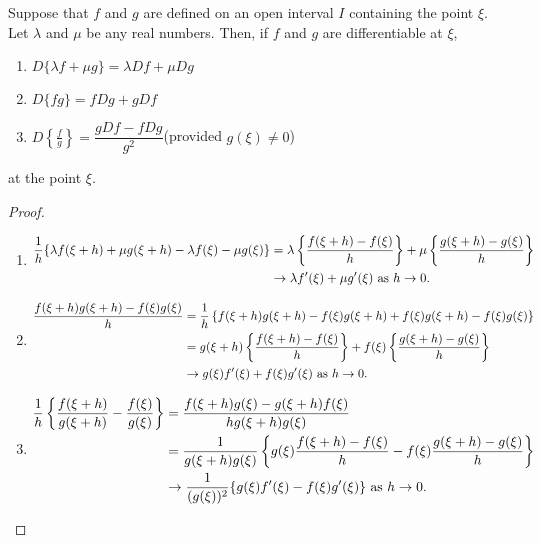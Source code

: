 \documentclass[10pt, a4paper]{article}
\begin{document}
\begin{theorem}
    Suppose that $f$ and $g$ are defined on an open interval $I$ containing the point $\xi$. Let $\lambda$ and $\mu$ be any real numbers. Then, if $f$ and $g$ are differentiable at $\xi$,
    \begin{enumerate}[label = (\roman*)]
        \item $D\{\lambda f + \mu g\} = \lambda Df + \mu Dg$
        \item $D\{fg\} = fDg + gDf$
        \item $D\left\{\frac{f}{g}\right\} = \dfrac{gDf - fDg}{g ^ 2}$\quad(provided $g(\xi) \neq 0$)
    \end{enumerate}
    at the point $\xi$.
    \begin{proof}
        \phantom{} \\
        \begin{enumerate}[label = (\roman*)]
            \item
                \begin{align*}
                    \frac{1}{h}\{\lambda f(\xi + h) + \mu g(\xi + h) - \lambda f(\xi) - \mu g(\xi)\} &= \lambda \left\{\dfrac{f(\xi + h) - f(\xi)}{h}\right\} + \mu \left\{\dfrac{g(\xi + h) - g(\xi)}{h}\right\} \\
                    &\rightarrow \lambda f'(\xi) + \mu g'(\xi) \textnormal{ as } h \rightarrow 0.
                \end{align*}
            \item
                \begin{align*}
                    \dfrac{f(\xi + h)g(\xi + h) - f(\xi)g(\xi)}{h} &= \frac{1}{h}\left\{f(\xi + h)g(\xi + h) - f(\xi)g(\xi + h) + f(\xi)g(\xi + h) - f(\xi)g(\xi)\right\} \\
                    &= g(\xi + h) \left\{\dfrac{f(\xi + h) - f(\xi)}{h}\right\} + f(\xi) \left\{\dfrac{g(\xi + h) - g(\xi)}{h}\right\} \\
                    &\rightarrow g(\xi)f'(\xi) + f(\xi)g'(\xi) \textnormal{ as } h \rightarrow 0.
                \end{align*}
            \item
                \begin{align*}
                    \frac{1}{h}\left\{\dfrac{f(\xi + h)}{g(\xi + h)} - \dfrac{f(\xi)}{g(\xi)}\right\} &= \dfrac{f(\xi + h)g(\xi) - g(\xi + h)f(\xi)}{hg(\xi + h)g(\xi)} \\
                    &= \dfrac{1}{g(\xi + h)g(\xi)}\left\{g(\xi)\dfrac{f(\xi + h) - f(\xi)}{h} - f(\xi)\dfrac{g(\xi + h) - g(\xi)}{h}\right\} \\
                    &\rightarrow\frac{1}{(g(\xi)) ^ 2}\{g(\xi)f'(\xi) - f(\xi)g'(\xi)\} \textnormal{ as } h \rightarrow 0.
                \end{align*}
        \end{enumerate}
    \end{proof}
\end{theorem}
\end{document}
